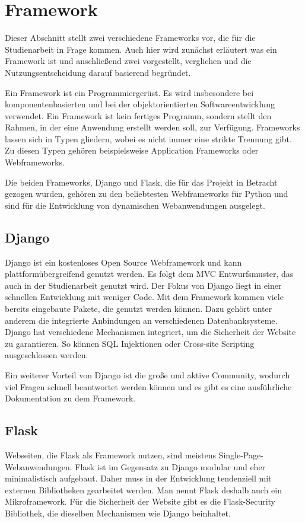 \section{Framework}
Dieser Abschnitt stellt zwei verschiedene Frameworks vor, die für die Studienarbeit in Frage kommen. Auch hier wird zunächst erläutert was ein Framework ist und anschließend zwei vorgestellt, verglichen und die Nutzungsentscheidung darauf basierend begründet. 

Ein Framework ist ein Programmiergerüst. Es wird insbesondere bei komponentenbasierten und bei der objektorientierten Softwareentwicklung verwendet. Ein Framework ist kein fertiges Programm, sondern stellt den Rahmen, in der eine Anwendung erstellt werden soll, zur Verfügung. Frameworks lassen sich in Typen gliedern, wobei es nicht immer eine strikte Trennung gibt. Zu diesen Typen gehören beispielsweise  Application Frameworks oder Webframeworks.

Die beiden Frameworks, Django und Flask, die für das Projekt in Betracht gezogen wurden, gehören zu den beliebtesten Webframeworks für Python und sind für die Entwicklung von dynamischen Webanwendungen ausgelegt. 

\subsection{Django}
Django ist ein kostenloses Open Source Webframework und kann plattformübergreifend genutzt werden. Es folgt dem \ac{MVC} Entwurfsmuster, das auch in der Studienarbeit genutzt wird. Der Fokus von Django liegt in einer schnellen Entwicklung mit weniger Code. Mit dem Framework kommen viele bereits eingebaute Pakete, die genutzt werden können. Dazu gehört unter anderem die integrierte Anbindungen an verschiedenen Datenbanksysteme. Django hat verschiedene Mechanismen integriert, um die Sicherheit der Website zu garantieren. So können SQL Injektionen oder Cross-site Scripting ausgeschlossen werden.

Ein weiterer Vorteil von Django ist die große und aktive Community, wodurch viel Fragen schnell beantwortet werden können und es gibt es eine ausführliche Dokumentation zu dem Framework. 

\subsection{Flask}
Webseiten, die Flask als Framework nutzen, sind meistens Single-Page-Webanwendungen. Flask ist im Gegensatz zu Django modular und eher minimalistisch aufgebaut. Daher muss in der Entwicklung tendenziell mit externen Bibliotheken gearbeitet werden. Man nennt Flask deshalb auch ein Mikroframework. Für die Sicherheit der Website gibt es die Flask-Security Bibliothek, die dieselben Mechanismen wie Django beinhaltet.

